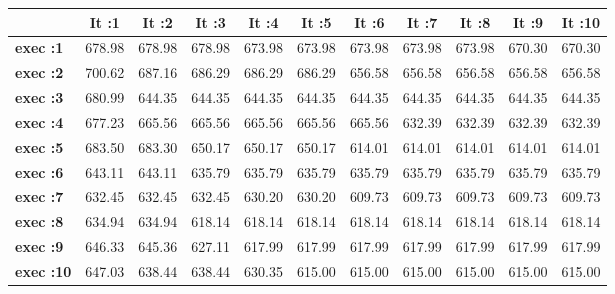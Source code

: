 \begin{tiny}\begin{tabular}{|l|c|c|c|c|c|c|c|c|c|c|}
\hline
&\textbf{It :1}&\textbf{It :2}&\textbf{It :3}&\textbf{It :4}&\textbf{It :5}&\textbf{It :6}&\textbf{It :7}&\textbf{It :8}&\textbf{It :9}&\textbf{It :10}\\\hline
\textbf{exec :1}&678.98&678.98&678.98&673.98&673.98&673.98&673.98&673.98&670.30&670.30\\\hline
\textbf{exec :2}&700.62&687.16&686.29&686.29&686.29&656.58&656.58&656.58&656.58&656.58\\\hline
\textbf{exec :3}&680.99&644.35&644.35&644.35&644.35&644.35&644.35&644.35&644.35&644.35\\\hline
\textbf{exec :4}&677.23&665.56&665.56&665.56&665.56&665.56&632.39&632.39&632.39&632.39\\\hline
\textbf{exec :5}&683.50&683.30&650.17&650.17&650.17&614.01&614.01&614.01&614.01&614.01\\\hline
\textbf{exec :6}&643.11&643.11&635.79&635.79&635.79&635.79&635.79&635.79&635.79&635.79\\\hline
\textbf{exec :7}&632.45&632.45&632.45&630.20&630.20&609.73&609.73&609.73&609.73&609.73\\\hline
\textbf{exec :8}&634.94&634.94&618.14&618.14&618.14&618.14&618.14&618.14&618.14&618.14\\\hline
\textbf{exec :9}&646.33&645.36&627.11&617.99&617.99&617.99&617.99&617.99&617.99&617.99\\\hline
\textbf{exec :10}&647.03&638.44&638.44&630.35&615.00&615.00&615.00&615.00&615.00&615.00\\\hline
\end{tabular}
\end{tiny}